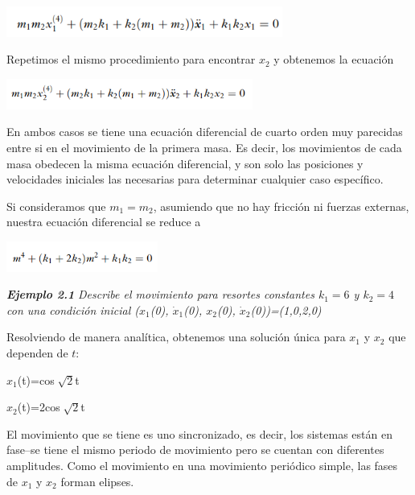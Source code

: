 \documentclass{article}
\begin{document}
	\begin{center}
    \includegraphics[height=1cm]{ec2_3.png}
    \end{center}

Repetimos el mismo procedimiento para encontrar $x_2$ y obtenemos la ecuación

	\begin{center}
    \includegraphics[height=1cm]{ec2_5.png}
    \end{center}

En ambos casos se tiene una ecuación diferencial de cuarto orden muy parecidas entre si en el movimiento de la primera masa. Es decir, los movimientos de cada masa obedecen la misma ecuación diferencial, y son solo las posiciones y velocidades iniciales las necesarias para determinar cualquier caso específico.

Si consideramos que $m_1=m_2$, asumiendo que no hay fricción ni fuerzas externas, nuestra ecuación diferencial se reduce a

	\begin{center}
    \includegraphics[height=1cm]{ec2_7.png}
    \end{center}

\textbf{\textit{Ejemplo 2.1}} 
\textit{Describe el movimiento para resortes constantes $k_1=6$ y $k_2=4$ con una condición inicial ($x_1$(0), $\dot{x}_1$(0), $x_2$(0), $\dot{x}_2$(0))=(1,0,2,0)}

Resolviendo de manera analítica, obtenemos una solución única para $x_1$ y $x_2$ que dependen de $t$:

\begin{center}
$x_1$(t)=cos$\sqrt[]{2}$t
\end{center}

\begin{center}
$x_2$(t)=2cos$\sqrt[]{2}$t
\end{center}

El movimiento que se tiene es uno sincronizado, es decir, los sistemas están en fase--se tiene el mismo periodo de movimiento pero se cuentan con diferentes amplitudes. Como el movimiento en una movimiento periódico simple, las fases de $x_1$ y $x_2$ forman elipses.
\end{document}
